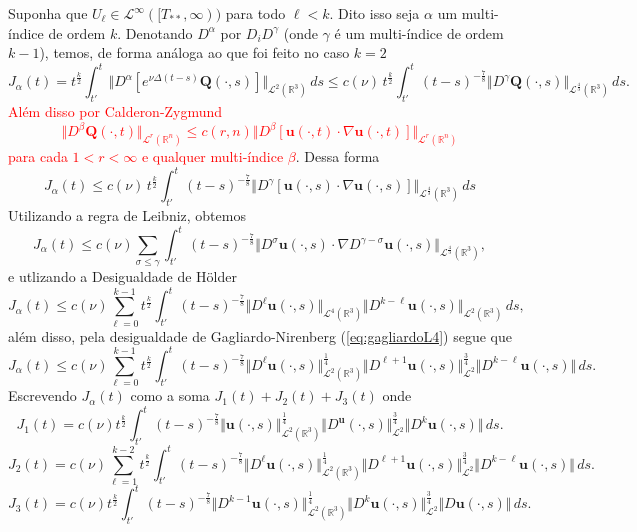 \documentclass[a4paper, 11pt]{book}
\theoremstyle{definition}
\newcommand{\bR}{\mathbb{R}}
\newcommand{\bu}{\mathbf{u}}
\newcommand{\BQ}{\mathbf{Q}}
\newcommand{\cL}{\mathcal{L}}
\begin{document}
\begin{prf}
    Suponha que $U_{\ell} \in \cL^\infty([T_{**},\infty))$ para todo $\ell < k$. Dito isso seja $\alpha$ um multi-índice de ordem $k$.
    Denotando $D^\alpha$ por $D_i D^{\gamma}$ (onde $\gamma$ é um multi-índice de ordem $k-1$), temos, de forma análoga ao que foi feito no caso $k = 2$
    \[
        J_\alpha(t) = t^{\frac{k}{2}} \int_{t'}^t \Vert D^\alpha [ e^{\nu \Delta (t - s)}\BQ(\cdot,s)] \Vert_{\cL^2(\bR^3)} \,ds \leqslant c(\nu) \, t^{\frac{k}{2}} \int_{t'}^t (t - s)^{-\frac{7}{8}} \Vert D^{\gamma} \BQ(\cdot,s) \Vert_{\cL^\frac{4}{3}(\bR^3)} \,ds.
    \]
    \textcolor{red}{Além disso por Calderon-Zygmund
    \[
        \Vert D^{\beta}\BQ(\cdot,t) \Vert_{\cL^r(\bR^n)} \leqslant c(r,n) \Vert D^{\beta} [ \bu(\cdot,t) \cdot \nabla \bu(\cdot,t) ] \Vert_{\cL^r(\bR^n)}
    \]
    para cada $1 < r < \infty$ e qualquer multi-índice $\beta$}. Dessa forma
    \[
        J_\alpha(t) \leqslant c(\nu)\, t^{\frac{k}{2}} \int_{t'}^t (t-s)^{-\frac{7}{8}} \Vert D^{\gamma} [\bu(\cdot,s) \cdot \nabla \bu(\cdot,s)] \Vert_{\cL^\frac{4}{3}(\bR^3)}\,ds
    \]
    Utilizando a regra de Leibniz, obtemos
    \[
        J_\alpha(t) \leqslant c(\nu) \sum_{\sigma \leqslant \gamma} \int_{t'}^t (t - s)^{-\frac{7}{8}} \Vert D^{\sigma} \bu(\cdot,s) \cdot \nabla D^{\gamma - \sigma} \bu(\cdot,s) \Vert_{\cL^{\frac{4}{3}}(\bR^3)},
    \]
    e utlizando a Desigualdade de Hölder
    \[
        J_\alpha(t) \leqslant c(\nu) \sum_{\ell = 0}^{k-1} t^{\frac{k}{2}} \int_{t'}^t (t- s)^{-\frac{7}{8}} \Vert D^\ell \bu(\cdot,s) \Vert_{\cL^4(\bR^3)} \Vert D^{k-\ell} \bu(\cdot,s) \Vert_{\cL^2(\bR^3)}\,ds,
    \]
    além disso, pela desigualdade de Gagliardo-Nirenberg (\ref{eq:gagliardoL4}) segue que
    \[
        J_\alpha(t) \leqslant c(\nu) \sum_{\ell=0}^{k-1} t^{\frac{k}{2}} \int_{t'}^t ( t- s)^{-\frac{7}{8}} \Vert D^\ell \bu(\cdot,s) \Vert_{\cL^2(\bR^3)}^{\frac{1}{4}} \Vert D^{\ell + 1} \bu(\cdot,s) \Vert_{\cL^2}^{\frac{3}{4}} \Vert D^{k-\ell} \bu(\cdot,s) \Vert \,ds.
    \]
    Escrevendo $J_\alpha(t)$ como a soma $J_1(t) + J_2(t) + J_3(t)$ onde
    \[
        J_1(t) = c(\nu) t^{\frac{k}{2}} \int_{t'}^t ( t- s)^{-\frac{7}{8}} \Vert \bu(\cdot,s) \Vert_{\cL^2(\bR^3)}^{\frac{1}{4}} \Vert D^ \bu(\cdot,s) \Vert_{\cL^2}^{\frac{3}{4}} \Vert D^{k} \bu(\cdot,s) \Vert \,ds.
    \]
    \[
        J_2(t) = c(\nu) \sum_{\ell=1}^{k-2} t^{\frac{k}{2}} \int_{t'}^t ( t- s)^{-\frac{7}{8}} \Vert D^\ell \bu(\cdot,s) \Vert_{\cL^2(\bR^3)}^{\frac{1}{4}} \Vert D^{\ell + 1} \bu(\cdot,s) \Vert_{\cL^2}^{\frac{3}{4}} \Vert D^{k-\ell} \bu(\cdot,s) \Vert \,ds.
    \]
    \[
        J_3(t) = c(\nu) t^{\frac{k}{2}} \int_{t'}^t ( t- s)^{-\frac{7}{8}} \Vert D^{k-1} \bu(\cdot,s) \Vert_{\cL^2(\bR^3)}^{\frac{1}{4}} \Vert D^{k} \bu(\cdot,s) \Vert_{\cL^2}^{\frac{3}{4}} \Vert D \bu(\cdot,s) \Vert \,ds.
\]
\end{prf}
\end{document}
